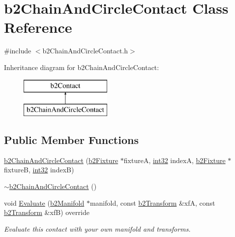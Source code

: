 \hypertarget{classb2_chain_and_circle_contact}{}\section{b2\+Chain\+And\+Circle\+Contact Class Reference}
\label{classb2_chain_and_circle_contact}


{\ttfamily \#include $<$b2\+Chain\+And\+Circle\+Contact.\+h$>$}

Inheritance diagram for b2\+Chain\+And\+Circle\+Contact\+:\begin{figure}[H]
\begin{center}
\leavevmode
\includegraphics[height=2.000000cm]{classb2_chain_and_circle_contact}
\end{center}
\end{figure}
\subsection*{Public Member Functions}
\begin{DoxyCompactItemize}
\item 
\mbox{\hyperlink{classb2_chain_and_circle_contact_a7303997b9af2b859346b4fc4d7e107d5}{b2\+Chain\+And\+Circle\+Contact}} (\mbox{\hyperlink{classb2_fixture}{b2\+Fixture}} $\ast$fixtureA, \mbox{\hyperlink{b2_settings_8h_a43d43196463bde49cb067f5c20ab8481}{int32}} indexA, \mbox{\hyperlink{classb2_fixture}{b2\+Fixture}} $\ast$fixtureB, \mbox{\hyperlink{b2_settings_8h_a43d43196463bde49cb067f5c20ab8481}{int32}} indexB)
\item 
\mbox{\hyperlink{classb2_chain_and_circle_contact_a2a6183729344e888840168a7207357ab}{$\sim$b2\+Chain\+And\+Circle\+Contact}} ()
\item 
void \mbox{\hyperlink{classb2_chain_and_circle_contact_abdc7f895b76f99f7ddc444ed11986c89}{Evaluate}} (\mbox{\hyperlink{structb2_manifold}{b2\+Manifold}} $\ast$manifold, const \mbox{\hyperlink{structb2_transform}{b2\+Transform}} \&xfA, const \mbox{\hyperlink{structb2_transform}{b2\+Transform}} \&xfB) override
\begin{DoxyCompactList}\small\item\em Evaluate this contact with your own manifold and transforms. \end{DoxyCompactList}\end{DoxyCompactItemize}
